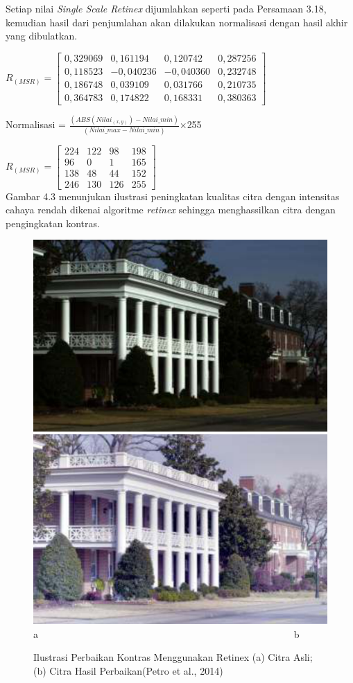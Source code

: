 \noindent Setiap nilai \emph{Single Scale Retinex} dijumlahkan seperti pada Persamaan 3.18, kemudian hasil dari penjumlahan akan dilakukan normalisasi dengan hasil akhir yang dibulatkan.

\noindent
$R_{(MSR)}=\left[
\begin{matrix}
0,329069&	0,161194&	0,120742&	0,287256\\
0,118523&	-0,040236&	-0,040360&	0,232748\\
0,186748&	0,039109&	0,031766&	0,210735\\
0,364783&	0,174822&	0,168331&	0,380363
\end{matrix}
\right]$

\noindent Normalisasi = $\frac{(ABS(Nilai_{(x,y)})-Nilai\_min)}{(Nilai\_max-Nilai\_min)}$$\times$255

\noindent
$R_{(MSR)}=\left[
\begin{matrix}
224&	122&	98&		198\\
96&		0&		1&		165\\
138&	48&		44&		152\\
246&	130&	126&	255

\end{matrix}
\right]$\\
Gambar 4.3 menunjukan ilustrasi peningkatan kualitas citra dengan intensitas cahaya rendah dikenai algoritme \emph{retinex} sehingga menghassilkan citra dengan pengingkatan kontras.
\begin{figure}[H]
	\centering
	\includegraphics[width=0.4\linewidth]{ret1}
	\includegraphics[width=0.4\linewidth]{ret2}\\
	a \ \ \ \ \ \ \ \ \ \ \ \ \ \ \ \ \ \ \ \  \ \ \ \ \ \ \ \ \ \ \ \ \ \ \ \ \ \ \ \ \ \ \ \ \ \ \ \ \ \ \ \ b
	\caption{Ilustrasi Perbaikan Kontras Menggunakan Retinex (a) Citra Asli; (b) Citra Hasil Perbaikan(Petro et al., 2014)}
	\label{fig:ret1}
	\label{fig:ret2}
\end{figure}


